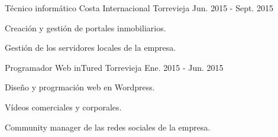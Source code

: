 \begin{cventries}
  \cventry
    {Técnico informático} %
    {Costa Internacional} %
    {Torrevieja} %
    {Jun. 2015 - Sept. 2015} %
    {
      \begin{cvitems} %
        \item {Creación y gestión de portales inmobiliarios.}
        \item {Gestión de los servidores locales de la empresa.}
      \end{cvitems}
    }

  \cventry
    {Programador Web} %
    {inTured} %
    {Torrevieja} %
    {Ene. 2015 - Jun. 2015} %
    {
      \begin{cvitems} %
        \item {Diseño y progrmación web en Wordpress.}
        \item {Vídeos comerciales y corporales.}
        \item {Community manager de las redes sociales de la empresa.}
      \end{cvitems}
    }

\end{cventries}
